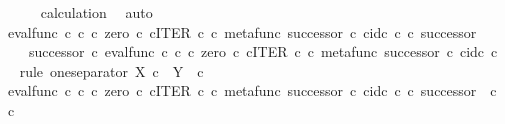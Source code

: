 \begin{isabellebody}
\ \ \ \ \isamarkupfalse%
\ calculation\ \isamarkupfalse%
\ auto\isanewline
\ \ \isamarkupfalse%
\ {\isachardoublequoteopen}{\isacharparenleft}{\kern0pt}eval{\isacharunderscore}{\kern0pt}func\ {\isasymnat}\isactrlsub c\ {\isasymnat}\isactrlsub c\ {\isasymcirc}\isactrlsub c\ {\isasymlangle}zero\ {\isasymcirc}\isactrlsub c\ {\isasymbeta}\isactrlbsub {\isasymnat}\isactrlsub c\isactrlesub {\isacharcomma}{\kern0pt}ITER\ {\isasymnat}\isactrlsub c\ {\isasymcirc}\isactrlsub c\ {\isasymlangle}metafunc\ successor\ {\isasymcirc}\isactrlsub c\ {\isasymbeta}\isactrlbsub {\isasymnat}\isactrlsub c\isactrlesub {\isacharcomma}{\kern0pt}id\isactrlsub c\ {\isasymnat}\isactrlsub c{\isasymrangle}{\isasymrangle}{\isacharparenright}{\kern0pt}\ {\isasymcirc}\isactrlsub c\ successor\ {\isacharequal}{\kern0pt}\isanewline
\ \ \ \ successor\ {\isasymcirc}\isactrlsub c\ eval{\isacharunderscore}{\kern0pt}func\ {\isasymnat}\isactrlsub c\ {\isasymnat}\isactrlsub c\ {\isasymcirc}\isactrlsub c\ {\isasymlangle}zero\ {\isasymcirc}\isactrlsub c\ {\isasymbeta}\isactrlbsub {\isasymnat}\isactrlsub c\isactrlesub {\isacharcomma}{\kern0pt}ITER\ {\isasymnat}\isactrlsub c\ {\isasymcirc}\isactrlsub c\ {\isasymlangle}metafunc\ successor\ {\isasymcirc}\isactrlsub c\ {\isasymbeta}\isactrlbsub {\isasymnat}\isactrlsub c\isactrlesub {\isacharcomma}{\kern0pt}id\isactrlsub c\ {\isasymnat}\isactrlsub c{\isasymrangle}{\isasymrangle}{\isachardoublequoteclose}\isanewline
\ \ \isamarkupfalse%
{\isacharparenleft}{\kern0pt}rule\ one{\isacharunderscore}{\kern0pt}separator{\isacharbrackleft}{\kern0pt}\ X\ {\isacharequal}{\kern0pt}{\isachardoublequoteopen}{\isasymnat}\isactrlsub c{\isachardoublequoteclose}{\isacharcomma}{\kern0pt}\ \ Y\ {\isacharequal}{\kern0pt}\ {\isachardoublequoteopen}{\isasymnat}\isactrlsub c{\isachardoublequoteclose}{\isacharbrackright}{\kern0pt}{\isacharparenright}{\kern0pt}\isanewline
\ \ \ \ \isamarkupfalse%
\ {\isachardoublequoteopen}{\isacharparenleft}{\kern0pt}eval{\isacharunderscore}{\kern0pt}func\ {\isasymnat}\isactrlsub c\ {\isasymnat}\isactrlsub c\ {\isasymcirc}\isactrlsub c\ {\isasymlangle}zero\ {\isasymcirc}\isactrlsub c\ {\isasymbeta}\isactrlbsub {\isasymnat}\isactrlsub c\isactrlesub {\isacharcomma}{\kern0pt}ITER\ {\isasymnat}\isactrlsub c\ {\isasymcirc}\isactrlsub c\ {\isasymlangle}metafunc\ successor\ {\isasymcirc}\isactrlsub c\ {\isasymbeta}\isactrlbsub {\isasymnat}\isactrlsub c\isactrlesub {\isacharcomma}{\kern0pt}id\isactrlsub c\ {\isasymnat}\isactrlsub c{\isasymrangle}{\isasymrangle}{\isacharparenright}{\kern0pt}\ {\isasymcirc}\isactrlsub c\ successor\ {\isacharcolon}{\kern0pt}\ {\isasymnat}\isactrlsub c\ {\isasymrightarrow}\ {\isasymnat}\isactrlsub c{\isachardoublequoteclose}\isanewline

\end{isabellebody}

